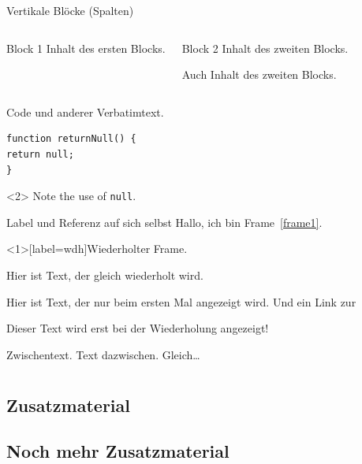 \documentclass[t, aspectratio=169, handout, ngerman]{beamer}
\begin{document}
	\begin{frame}{Vertikale Blöcke (Spalten)}
		\begin{columns}
				\begin{block}{Block 1}
					Inhalt des ersten Blocks.
				\end{block}
				\begin{block}{Block 2}
					Inhalt des zweiten Blocks.

					Auch Inhalt des zweiten Blocks.
				\end{block}
		\end{columns}
	\end{frame}

\begin{frame}[fragile]{Code und anderer Verbatimtext.}
\begin{verbatim}
function returnNull() {
return null;
}
\end{verbatim}
\begin{uncoverenv}<2>
Note the use of \verb|null|.
\end{uncoverenv}
\end{frame}

	\begin{frame}[label=frame1]{Label und Referenz auf sich selbst}
		Hallo, ich bin Frame~\autoref{frame1}.
	\end{frame}

	\begin{frame}[label=wdh]{Wiederholter Frame.}

		Hier ist Text, der gleich wiederholt wird.

		\begin{overprint}
			Hier ist Text, der nur beim ersten Mal angezeigt wird.
			Und ein Link zur \hyperlink{wdh<2>}{}

			Dieser Text wird erst bei der Wiederholung angezeigt!
		\end{overprint}
	\end{frame}

	\begin{frame}{Zwischentext.}
		Text dazwischen. Gleich\dots
	\end{frame}









	\appendix

	\section{\appendixname}

	\frame{\tableofcontents}

	\subsection{Zusatzmaterial}


	\subsection{Noch mehr Zusatzmaterial}

\end{document}
